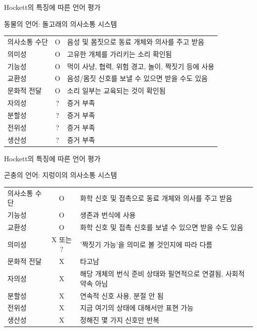 \documentclass[11pt, aspectratio=169]{beamer}
\begin{document}
\begin{frame}[t]{Hockett의 특징에 따른 언어 평가}
  \begin{block}{동물의 언어: 돌고래의 의사소통 시스템}
    \begin{tabular}{lcl}
    의사소통 수단 & O & 음성 및 몸짓으로 동료 개체와 의사를 주고 받음\\
    의미성 & O & 고유한 개체를 가리키는 소리 확인됨\\
    기능성 & O & 먹이 사냥, 협력, 위험 경고, 놀이, 짝짓기 등에 사용\\
    교환성 & O & 음성/몸짓 신호를 보낼 수 있으면 받을 수도 있음\\
    문화적 전달 & O & 소리 일부는 교육되는 것이 확인됨 \\
    자의성 & ? & 증거 부족\\
    분할성 & ? & 증거 부족\\
    전위성 & ? & 증거 부족\\
    생산성 & ? & 증거 부족
    \end{tabular}
  \end{block}
\end{frame}

\begin{frame}[t]{Hockett의 특징에 따른 언어 평가}
  \begin{block}{곤충의 언어: 지렁이의 의사소통 시스템}
    \begin{tabular}{lcl}
    의사소통 수단 & O & 화학 신호 및 접촉으로 동료 개체와 의사를 주고 받음\\
    기능성 & O & 생존과 번식에 사용\\
    교환성 & O & 화학 신호 및 접촉 신호를 보낼 수 있으면 받을 수도 있음\\
    의미성 & X 또는 ? & '짝짓기 가능'을 의미로 볼 것인지에 따라 다름 \\
    문화적 전달 & X & 타고남 \\
    자의성 & X & 해당 개체의 번식 준비 상태와 필연적으로 연결됨, 사회적 약속 아님\\
    분할성 & X & 연속적 신호 사용, 분절 안 됨\\
    전위성 & X & 지금 여기의 상태에 대해서만 표현 가능\\
    생산성 & X & 정해진 몇 가지 신호만 반복
    \end{tabular}
  \end{block}
\end{frame}
\end{document}
